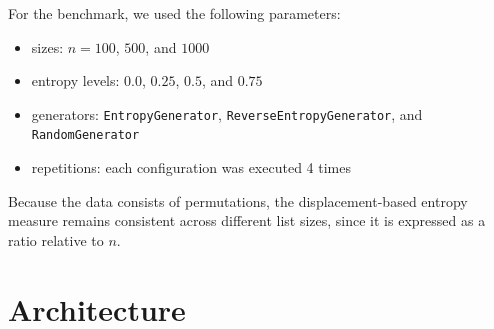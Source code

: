 \documentclass{article}
\begin{document}
For the benchmark, we used the following parameters:
\begin{itemize}
    \item sizes: $n = 100$, $500$, and $1000$
    \item entropy levels: $0.0$, $0.25$, $0.5$, and $0.75$
    \item generators: \texttt{EntropyGenerator}, \texttt{ReverseEntropyGenerator}, and \texttt{RandomGenerator}
    \item repetitions: each configuration was executed 4 times
\end{itemize}

Because the data consists of permutations, the displacement-based entropy measure remains consistent across different list sizes, since it is expressed as a ratio relative to $n$.

\section{Architecture}
\end{document}
